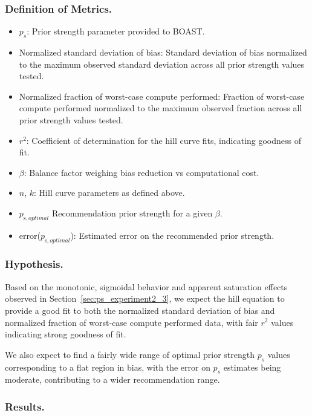     \subsubsection{Definition of Metrics.}

        \begin{itemize}
            \item $p_s$: Prior strength parameter provided to BOAST.
            \item Normalized standard deviation of bias: Standard deviation of bias normalized to the maximum observed standard deviation across all prior strength values tested.
            \item Normalized fraction of worst-case compute performed: Fraction of worst-case compute performed normalized to the maximum observed fraction across all prior strength values tested.
            \item $r^2$: Coefficient of determination for the hill curve fits, indicating goodness of fit.
            \item $\beta$: Balance factor weighing bias reduction vs computational cost.
            \item $n$, $k$: Hill curve parameters as defined above.
            \item $p_{\text{s}, optimal}$ Recommendation prior strength for a given $\beta$.
            \item error($p_{\text{s}, optimal}$): Estimated error on the recommended prior strength.
        \end{itemize}

    \subsubsection{Hypothesis.}

    Based on the monotonic, sigmoidal behavior and apparent saturation effects observed in Section~\ref{sec:ps_experiment2_3}, we expect the hill equation to provide a good fit to both the normalized standard deviation of bias and normalized fraction of worst-case compute performed data, with fair $r^2$ values indicating strong goodness of fit.

    We also expect to find a fairly wide range of optimal prior strength $p_s$ values corresponding to a flat region in bias, with the error on $p_s$ estimates being moderate, contributing to a wider recommendation range.

    \subsubsection{Results.}

